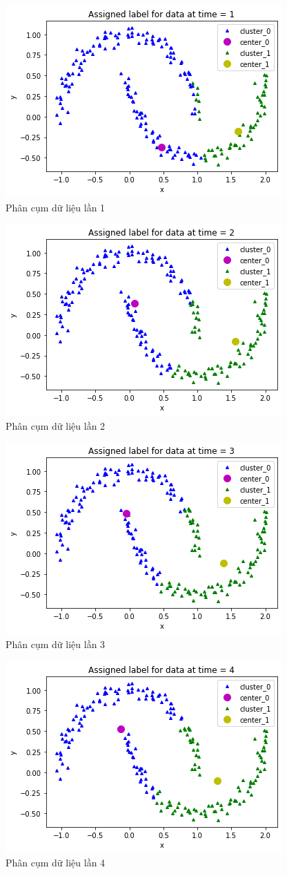 \documentclass{article}
\begin{document}
	\newpage
	\begin{figure}[h]
		\centering
		\includegraphics[width=0.6\linewidth]{img/moons2}
		\caption{Phân cụm dữ liệu lần 1}
	\end{figure}
	\begin{figure}[h]
		\centering
		\includegraphics[width=0.6\linewidth]{img/moons3}
		\caption{Phân cụm dữ liệu lần 2}
	\end{figure}
	\newpage
	\begin{figure}[h]
		\centering
		\includegraphics[width=0.6\linewidth]{img/moons4}
		\caption{Phân cụm dữ liệu lần 3}
	\end{figure}
	\begin{figure}[h]
		\centering
		\includegraphics[width=0.6\linewidth]{img/moons5}
		\caption{Phân cụm dữ liệu lần 4}
	\end{figure}
\end{document}
